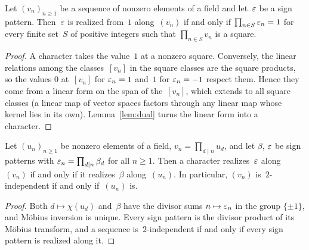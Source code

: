 \begin{lemma}
  \label{lem:sq-patterns}
  \leanok
  Let $(v_n)_{n \ge 1}$ be a sequence of nonzero elements of a field and let~$\varepsilon$ be a sign
  pattern. Then~$\varepsilon$ is realized from~$1$ along~$(v_n)$ if and only if
  $\prod_{n \in S} \varepsilon_n = 1$ for every finite set~$S$ of positive integers such that
  $\prod_{n \in S} v_n$ is a square.
\end{lemma}
\begin{proof}
  \leanok
  A character takes the value~$1$ at a nonzero square. Conversely, the linear relations among the
  classes~$[v_n]$ in the square classes are the square products, so the values $0$ at~$[v_n]$
  for $\varepsilon_n = 1$ and~$1$ for $\varepsilon_n = -1$ respect them. Hence they come from a linear form
  on the span of the~$[v_n]$, which extends to all square classes (a linear map of vector spaces
  factors through any linear map whose kernel lies in its own). Lemma~\ref{lem:dual} turns the
  linear form into a character.
\end{proof}

\begin{lemma}
  \label{lem:transfer}
  \leanok
  Let $(u_n)_{n \ge 1}$ be nonzero elements of a field, $v_n = \prod_{d \mid n} u_d$, and let
  $\beta$, $\varepsilon$ be sign patterns with $\varepsilon_n = \prod_{d \mid n} \beta_d$ for all $n \ge 1$.
  Then a character realizes~$\varepsilon$ along~$(v_n)$ if and only if it realizes~$\beta$
  along~$(u_n)$. In particular, $(v_n)$ is~$2$-independent if and only if~$(u_n)$ is.
\end{lemma}
\begin{proof}
  \leanok
  Both $d \mapsto \chi(u_d)$ and~$\beta$ have the divisor sums $n \mapsto \varepsilon_n$ in the group
  $\{\pm 1\}$, and Möbius inversion is unique. Every sign pattern is the divisor product of its
  Möbius transform, and a sequence is~$2$-independent if and only if every sign pattern is
  realized along it.
\end{proof}

